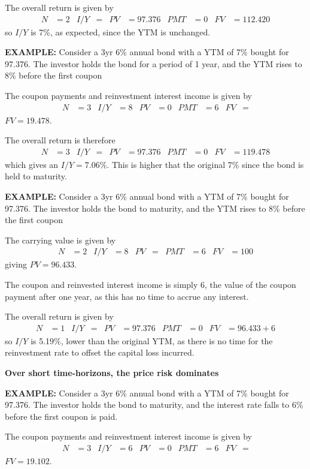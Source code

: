 \documentclass[../notes_compiled.tex]{subfiles}
\begin{document}
\begin{itemize}
{The overall return is given by
\begin{align*}
N&=2  & I / Y &= & PV &=97.376 & PMT &=0 & FV &=112.420
\end{align*}
so $I / Y$ is 7\%, as expected, since the YTM is unchanged.
\item[]
}
{\color{RedViolet}
\item[] \textbf{EXAMPLE:} Consider a 3yr 6\% annual bond with a YTM of 7\% bought for 97.376. The investor holds the bond for a period of 1 year, and the YTM rises to 8\% before the first coupon
}


{\color{RoyalBlue}
The coupon payments and reinvestment interest income is given by
\begin{align*}
N&=3  & I / Y &= 8 & PV &=0 & PMT &=6 & FV &=
\end{align*}
$FV=19.478$. 

The overall return is therefore
\begin{align*}
N&=3  & I / Y &=  & PV &=97.376 & PMT &=0 & FV &=119.478
\end{align*}
which gives an $I / Y=7.06\%$. This is higher that the original 7\% since the bond is held to maturity.
\item[]
}
{\color{RedViolet}
\item[] \textbf{EXAMPLE:} Consider a 3yr 6\% annual bond with a YTM of 7\% bought for 97.376. The investor holds the bond to maturity, and the YTM rises to 8\% before the first coupon
}
{\color{RoyalBlue}


The carrying value is given by 
\begin{align*}
N&=2  & I / Y &= 8 & PV &= & PMT &=6 & FV &=100
\end{align*}
giving $PV=96.433$.

The coupon and reinvested interest income is simply 6, the value of the coupon payment after one year, as this has no time to accrue any interest.

The overall return is given by
\begin{align*}
N&=1  & I / Y &= & PV &=97.376 & PMT &=0 & FV &=96.433 + 6
\end{align*}
so $I / Y$ is 5.19\%, lower than the original YTM, as there is no time for the reinvestment rate to offset the capital loss incurred.
}
\item[] \textbf{Over short time-horizons, the price risk dominates}

{\color{RedViolet}
\item[] \textbf{EXAMPLE:} Consider a 3yr 6\% annual bond with a YTM of 7\% bought for 97.376. The investor holds the bond to maturity, and the interest rate falls to 6\% before the first coupon is paid.
}
{\color{RoyalBlue}
\item[] The coupon payments and reinvestment interest income is given by
\begin{align*}
N&=3  & I / Y &= 6 & PV &=0 & PMT &=6 & FV &=
\end{align*}
$FV=19.102$. 

}
\end{itemize}
\end{document}

